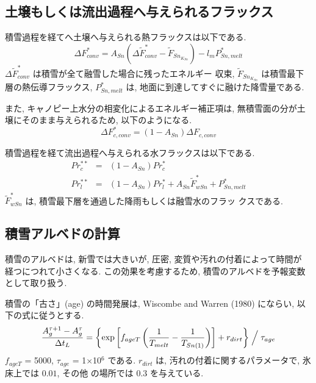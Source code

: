 \subsection{土壌もしくは流出過程へ与えられるフラックス}

積雪過程を経てへ土壌へ与えられる熱フラックスは以下である.
\begin{equation}
\Delta F_{conv}^* = A_{Sn} ( \Delta \widetilde{F}_{conv}^* - \widetilde{F}_{Sn_{K_{Sn}}} ) - l_m P_{Sn,melt}^*
\end{equation}
$\Delta \widetilde{F}_{conv}^*$ は積雪が全て融雪した場合に残ったエネルギー
収束, $\widetilde{F}_{Sn_{K_{Sn}}}$ は積雪最下層の熱伝導フラックス,
$P_{Sn,melt}^*$ は, 地面に到達してすぐに融けた降雪量である.

また, キャノピー上水分の相変化によるエネルギー補正項は, 無積雪面の分が土
壌にそのまま与えられるため, 以下のようになる.
\begin{equation}
 \Delta F_{c,conv}^* = ( 1 - A_{Sn}) \Delta F_{c,conv}
\end{equation}

積雪過程を経て流出過程へ与えられる水フラックスは以下である.
\begin{eqnarray}
 Pr_c^{**} &=& ( 1 - A_{Sn} ) Pr_c^{*} \\
 Pr_l^{**} &=& ( 1 - A_{Sn} ) Pr_l^{*} + A_{Sn} \widetilde{F}_{wSn}^*
 + P_{Sn,melt}^*
\end{eqnarray}
$\widetilde{F}_{wSn}^*$ は, 積雪最下層を通過した降雨もしくは融雪水のフラッ
クスである.

\subsection{積雪アルベドの計算}

積雪のアルベドは, 新雪では大きいが, 圧密, 変質や汚れの付着によって時間が
経つにつれて小さくなる. この効果を考慮するため, 積雪のアルベドを予報変数
として取り扱う.

積雪の「古さ」(age) の時間発展は, Wiscombe and Warren (1980) にならい,
以下の式に従うとする.
\begin{equation}
 \frac {A_{g}^{\tau +1} - A_{g}^{\tau}}{\Delta t_L}
 = \left\{
\exp \left[ f_{ageT} \left( \frac{1}{T_{melt}}-\frac{1}{T_{Sn(1)}}\right) \right]
  + r_{dirt} \right\} \Bigm/ {\tau_{age}}
\end{equation}
$f_{ageT}$ = 5000, $\tau_{age}$ = 1$\times$10$^6$ である.
$r_{dirt}$ は, 汚れの付着に関するパラメータで, 氷床上では $0.01$, その他
の場所では $0.3$ を与えている.

